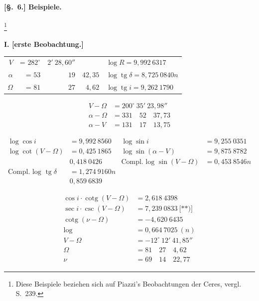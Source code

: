\documentclass[12pt,a4paper]{article}
\DeclareMathOperator{\tg}{tg}
\DeclareMathOperator{\cotg}{cotg}
\theoremstyle{plain}
\theoremstyle{definition}
\theoremstyle{remark}
\begin{document}
\newpage

\paragraph{[§.~6.] Beispiele.}\footnote{Diese Beispiele beziehen sich auf Piazzi's Beobachtungen der Ceres, vergl. S.~239.}

\noindent\textbf{I. [erste Beobachtung.]}
\begin{center}
\begin{tabular}{r@{\quad}r@{\quad}r@{\quad}r@{\quad}l}
$V$ &= $282^\circ$ & $2'\ 28{,}60''$ && $\log R = 9{,}992\ 6317$ \\
$\alpha$ &= $53$ & $19$ & $42{,}35$ & $\log \tg\delta = 8{,}725\ 0840n$ \\
$\Omega$ &= $81$ & $27$ & $4{,}62$ & $\log \tg i = 9{,}262\ 1790$
\end{tabular}
\end{center}

\begin{align*}
V - \Omega &= 200^\circ\ 35'\ 23{,}98'' \\
\alpha - \Omega &= 331\quad 52\quad 37{,}73 \\
\alpha - V &= 131\quad 17\quad 13{,}75
\end{align*}

\begin{align*}
\log \cos i &= 9{,}992\ 8560 & \log \sin i &= 9{,}255\ 0351 \\
\log \cot(V - \Omega) &= 0{,}425\ 1865 & \log \sin(\alpha - V) &= 9{,}875\ 8782 \\
& 0{,}418\ 0426 & \text{Compl.\ log } \sin(V - \Omega) &= 0{,}453\ 8546n \\
\text{Compl.\ log } \tg\delta &= 1{,}274\ 9160n \\
& 0{,}859\ 6839
\end{align*}

\begin{align*}
\cos i \cdot \cotg(V - \Omega) &= 2{,}618\ 4398 \\
\sec i \cdot \csc(V - \Omega) &= 7{,}239\ 0833\ \text{[**)]} \\
\cotg(\nu - \Omega) &= -4{,}620\ 6435 \\
\log &= 0{,}664\ 7025\ (n) \\
V - \Omega &= -12^\circ\ 12'\ 41{,}85'' \\
\Omega &= 81\quad 27\quad 4{,}62 \\
\nu &= 69\quad 14\quad 22{,}77
\end{align*}
\end{document}
